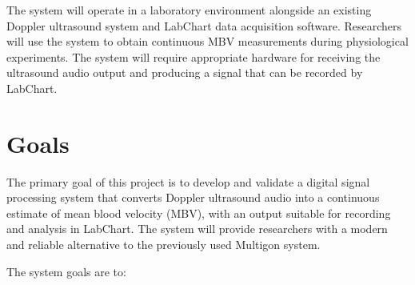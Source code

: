\documentclass{article}
\begin{document}
The system will operate in a laboratory environment alongside an existing Doppler ultrasound system and LabChart data acquisition software. Researchers will use the system to obtain continuous MBV measurements during physiological experiments. The system will require appropriate hardware for receiving the ultrasound audio output and producing a signal that can be recorded by LabChart.

\section{Goals}

The primary goal of this project is to develop and validate a digital signal processing system that converts Doppler ultrasound audio into a continuous estimate of mean blood velocity (MBV), with an output suitable for recording and analysis in LabChart. The system will provide researchers with a modern and reliable alternative to the previously used Multigon system.
 
The system goals are to:
 
\end{document}
